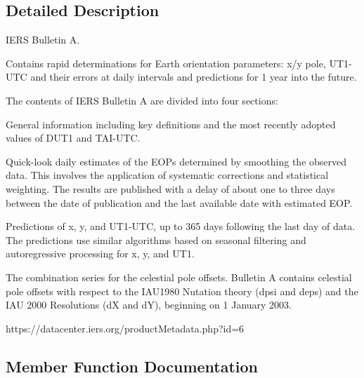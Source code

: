 \subsection{Detailed Description}
I\+E\+RS Bulletin A. 

Contains rapid determinations for Earth orientation parameters\+: x/y pole, U\+T1-\/\+U\+TC and their errors at daily intervals and predictions for 1 year into the future.

The contents of I\+E\+RS Bulletin A are divided into four sections\+:


\begin{DoxyEnumerate}
\item General information including key definitions and the most recently adopted values of D\+U\+T1 and T\+A\+I-\/\+U\+TC.
\item Quick-\/look daily estimates of the E\+O\+Ps determined by smoothing the observed data. This involves the application of systematic corrections and statistical weighting. The results are published with a delay of about one to three days between the date of publication and the last available date with estimated E\+OP.
\item Predictions of x, y, and U\+T1-\/\+U\+TC, up to 365 days following the last day of data. The predictions use similar algorithms based on seasonal filtering and autoregressive processing for x, y, and U\+T1.
\item The combination series for the celestial pole offsets. Bulletin A contains celestial pole offsets with respect to the I\+A\+U1980 Nutation theory (dpsi and deps) and the I\+AU 2000 Resolutions (dX and dY), beginning on 1 January 2003.
\end{DoxyEnumerate}

https\+://datacenter.iers.\+org/product\+Metadata.php?id=6 

\subsection{Member Function Documentation}
\mbox{\label{classostk_1_1physics_1_1coord_1_1frame_1_1provider_1_1iers_1_1_bulletin_a_aaef82b98b08ef2be421127ce3b8e2212}} 
